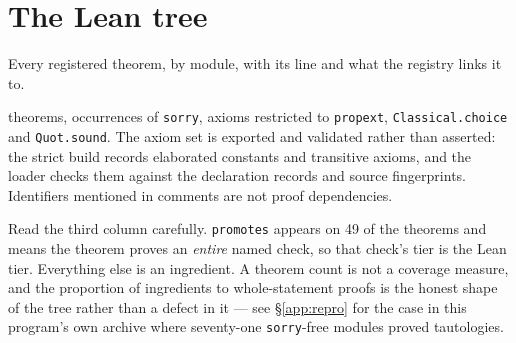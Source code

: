 \section{The Lean tree}
\label{app:lean}

Every registered theorem, by module, with its line and what the
registry links it to.

\LeanTotal{} theorems, \LeanSorry{} occurrences of \texttt{sorry},
axioms restricted to \texttt{propext}, \texttt{Classical.choice} and
\texttt{Quot.sound}. The axiom set is exported and validated rather
than asserted: the strict build records elaborated constants and
transitive axioms, and the loader checks them against the declaration
records and source fingerprints. Identifiers mentioned in comments are
not proof dependencies.

Read the third column carefully. \texttt{promotes} appears on 49 of the
\LeanTotal{} theorems and means the theorem proves an \emph{entire}
named check, so that check's tier is the Lean tier. Everything else is
an ingredient. A theorem count is not a coverage measure, and the
proportion of ingredients to whole-statement proofs is the honest shape
of the tree rather than a defect in it --- see \S\ref{app:repro} for
the case in this program's own archive where seventy-one
\texttt{sorry}-free modules proved tautologies.


